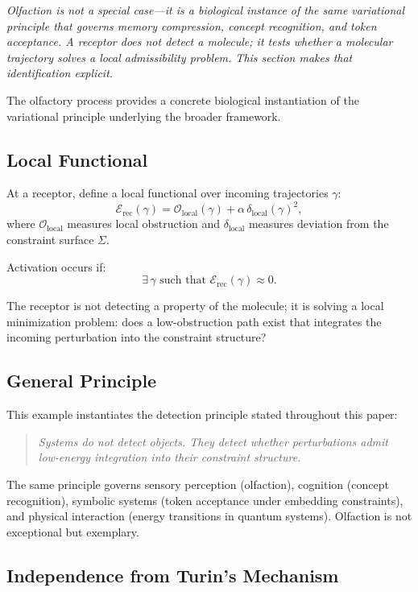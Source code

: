 \documentclass[12pt,a4paper]{article}
\begin{document}
\textit{Olfaction is not a special case---it is a biological instance of the same variational principle that governs memory compression, concept recognition, and token acceptance. A receptor does not detect a molecule; it tests whether a molecular trajectory solves a local admissibility problem. This section makes that identification explicit.}

The olfactory process provides a concrete biological instantiation of the variational principle underlying the broader framework.

\subsection{Local Functional}

At a receptor, define a local functional over incoming trajectories $\gamma$:
\[
\mathcal{E}_{\text{rec}}(\gamma)
=
\mathcal{O}_{\text{local}}(\gamma)
+
\alpha\,\delta_{\text{local}}(\gamma)^2,
\]
where $\mathcal{O}_{\text{local}}$ measures local obstruction and $\delta_{\text{local}}$ measures deviation from the constraint surface $\Sigma$.

Activation occurs if:
\[
\exists\,\gamma \text{ such that } \mathcal{E}_{\text{rec}}(\gamma) \approx 0.
\]

The receptor is not detecting a property of the molecule; it is solving a local minimization problem: does a low-obstruction path exist that integrates the incoming perturbation into the constraint structure?

\subsection{General Principle}

This example instantiates the detection principle stated throughout this paper:

\begin{quote}
\emph{Systems do not detect objects. They detect whether perturbations admit low-energy integration into their constraint structure.}
\end{quote}

The same principle governs sensory perception (olfaction), cognition (concept recognition), symbolic systems (token acceptance under embedding constraints), and physical interaction (energy transitions in quantum systems). Olfaction is not exceptional but exemplary.

\subsection{Independence from Turin's Mechanism}
\end{document}
